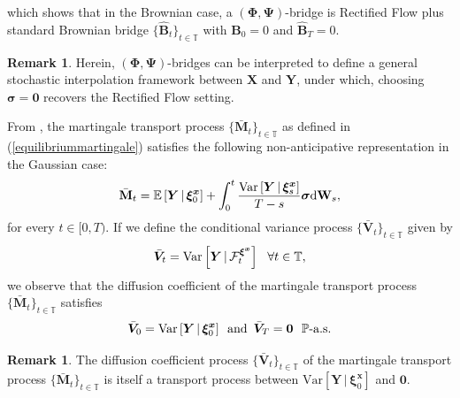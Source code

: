 \documentclass{article}
\def\P{\mathbb{P}}
\def\E{\mathbb{E}}
\def\T{\mathbb{T}}
\def\dd{\mathrm{d}}
\def\F{\mathcal{F}}
\def\xib{\boldsymbol{\xi}}
\theoremstyle{definition}
\newtheorem{remark}[proposition]{Remark}
\begin{document}
which shows that in the Brownian case, a $(\boldsymbol{\Phi}, \boldsymbol{\Psi})$-bridge is Rectified Flow plus standard Brownian bridge $\{\mathbf{\hat{B}}_{t}\}_{t\in\T}$ with $\mathbf{\hat{B}}_{0} = 0$ and $\mathbf{\hat{B}}_{T} = 0$.
\begin{remark}
Herein, $(\boldsymbol{\Phi}, \boldsymbol{\Psi})$-bridges can be interpreted to define a general stochastic interpolation framework between $\boldsymbol{X}$ and $\boldsymbol{Y}$, under which, choosing $\boldsymbol{\sigma} = \boldsymbol{0}$ recovers the Rectified Flow setting.
\end{remark}
From {\cite[Corollary~2.14]{goria_random-bridges_2025}}, the martingale transport process $\{\bar{\mathbf{M}}_t\}_{t\in\T}$ as defined in (\ref{equilibriummartingale}) satisfies the following non-anticipative representation in the Gaussian case:
\begin{align}
\bar{\mathbf{M}}_t = \E\left[ \boldsymbol{Y} \, | \, \xib^{\boldsymbol{x}}_0 \right] +  \int_0^t \frac{\text{Var}\left[ \boldsymbol{Y} \, | \, \xib^{\boldsymbol{x}}_s \right]}{T-s} \boldsymbol{\sigma}\dd \mathbf{W}_s, \notag
\end{align}
for every $t\in[0,T)$. If we define the conditional variance process $\{\bar{\boldsymbol{V}}_t\}_{t\in\T}$ given by
\begin{align}
\bar{\boldsymbol{V}}_t = \text{Var}\left[ \boldsymbol{Y} \, | \, \F_{t}^{\xib^{\boldsymbol{x}}} \right] \,\,\,\, \forall t\in\T, \notag
\end{align}
we observe that the diffusion coefficient of the martingale transport process $\{\bar{\mathbf{M}}_t\}_{t\in\T}$ satisfies
\begin{align}
\bar{\boldsymbol{V}}_0 = \text{Var}\left[ \boldsymbol{Y} \, | \, \xib^{\boldsymbol{x}}_0 \right] \,\,\, \text{and} \,\,\, \bar{\boldsymbol{V}}_T = \boldsymbol{0} \,\,\,\, \text{$\P$-a.s.} \notag
\end{align}
\begin{remark}
The diffusion coefficient process $\{\bar{\boldsymbol{V}}_t\}_{t\in\T}$ of the martingale transport process $\{\bar{\mathbf{M}}_t\}_{t\in\T}$ is itself a transport process between $\text{Var}\left[ \boldsymbol{Y} \, | \, \xib^{\boldsymbol{x}}_0 \right]$ and $\boldsymbol{0}$.
\end{remark}
\end{document}
